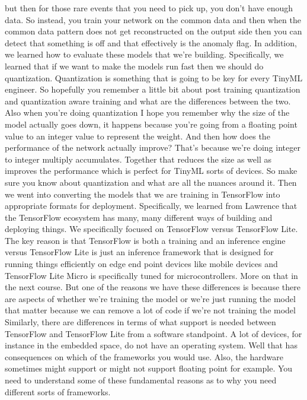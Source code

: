 but then for those rare events that you need to pick up,
you don't have enough data.
So instead, you train your network on the common data
and then when the common data pattern does not
get reconstructed on the output side then you
can detect that something is off and that effectively is the anomaly flag.
In addition, we learned how to evaluate these models that we're building.
Specifically, we learned that if we want to make the models run fast then
we should do quantization.
Quantization is something that is going to be key for every TinyML engineer.
So hopefully you remember a little bit about post training quantization
and quantization aware training and what are the differences between the two.
Also when you're doing quantization I hope
you remember why the size of the model actually goes down,
it happens because you're going from a floating point value to an integer
value to represent the weight.
And then how does the performance of the network actually improve?
That's because we're doing integer to integer multiply accumulates.
Together that reduces the size as well as improves
the performance which is perfect for TinyML sorts of devices.
So make sure you know about quantization and what are all the nuances around it.
Then we went into converting the models that we
are training in TensorFlow into appropriate formats for deployment.
Specifically, we learned from Lawrence that the TensorFlow ecosystem
has many, many different ways of building and deploying things.
We specifically focused on TensorFlow versus TensorFlow Lite.
The key reason is that TensorFlow is both a training
and an inference engine versus TensorFlow Lite
is just an inference framework that is designed for running things efficiently
on edge end point devices like mobile devices
and TensorFlow Lite Micro is specifically tuned
for microcontrollers.
More on that in the next course.
But one of the reasons we have these differences
is because there are aspects of whether we're training the model
or we're just running the model that matter
because we can remove a lot of code if we're not training the model
Similarly, there are differences in terms
of what support is needed between TensorFlow and TensorFlow Lite
from a software standpoint.
A lot of devices, for instance in the embedded space,
do not have an operating system.
Well that has consequences on which of the frameworks you would use.
Also, the hardware sometimes might support or might not
support floating point for example.
You need to understand some of these fundamental reasons
as to why you need different sorts of frameworks.
